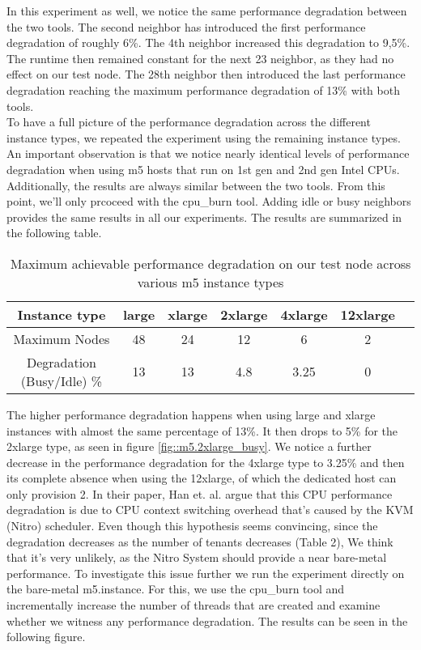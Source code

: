 \noindent
In this experiment as well, we notice the same performance degradation between the two tools. The second 
neighbor has introduced the first performance degradation of roughly 6\%. The 4th neighbor increased 
this degradation to 9,5\%. The runtime then remained constant for the next 23 neighbor, as they had no 
effect on our test node. The 28th neighbor then introduced the last performance degradation reaching the 
maximum performance degradation of 13\% with both tools. \\
To have a full picture of the performance degradation across the different instance types, we repeated 
the experiment using the remaining instance types. An important observation is that we notice nearly 
identical levels of performance degradation when using m5 hosts that run on 1st gen and 2nd gen Intel 
CPUs. Additionally, the results are always similar between the two tools. From this point, we'll only prcoceed 
with the cpu\_burn tool. Adding idle or busy neighbors provides 
the same results in all our experiments. The results are summarized in the following table. 
\begin{table}[H]
\centering
\begin{tabular}{ |c|c|c|c|c|c|c }
 Instance type & large & xlarge & 2xlarge & 4xlarge  & 12xlarge  \\
 \hline
 Maximum Nodes & 48 & 24 & 12 & 6 & 2 \\
 \hline
Degradation (Busy/Idle) \% & 13 & 13 & 4.8 & 3.25 & 0  \\ 

\end{tabular}
\caption{Maximum achievable performance degradation on our test node across various m5 instance types}
\end{table}
\noindent
The higher performance degradation happens when using large and xlarge instances with almost the same 
percentage of 13\%. It then drops to 5\% for the 2xlarge type, as seen in figure \ref{fig::m5.2xlarge_busy}.
We notice a further decrease in the performance degradation for the 4xlarge type to 3.25\% and then its complete 
absence when using the 12xlarge, of which the dedicated host can only provision 2. 
In their paper, Han et. al. \cite{contention} argue that this CPU performance degradation is due to CPU 
context switching overhead that's caused by the KVM (Nitro) scheduler. Even though this hypothesis 
seems convincing, since the degradation decreases as the number of tenants decreases (Table 2), 
We think that it's very unlikely, as the Nitro System should provide a near bare-metal performance. 
To investigate this issue further we run the experiment directly on the bare-metal m5.instance. For this, we use 
the cpu\_burn tool and incrementally increase the number of threads that are created and examine
whether we witness any performance degradation. The results can be seen in the following figure.

